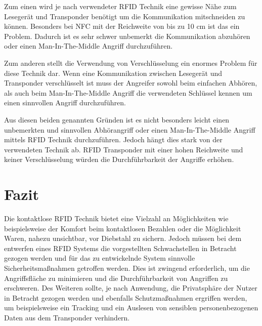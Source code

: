 \documentclass[conference]{IEEEtran}
\begin{document}
Zum einen wird je nach verwendeter RFID Technik eine gewisse Nähe zum Lesegerät und Transponder benötigt um die Kommunikation mitschneiden zu können. Besonders bei NFC mit der Reichweite von bis zu 10 cm ist das ein Problem. Dadurch ist es sehr schwer unbemerkt die Kommunikation abzuhören oder einen Man-In-The-Middle Angriff durchzuführen.

Zum anderen stellt die Verwendung von Verschlüsselung ein enormes Problem für diese Technik dar. Wenn eine Kommunikation zwischen Lesegerät und Transponder verschlüsselt ist muss der Angreifer sowohl beim einfachen Abhören, als auch beim Man-In-The-Middle Angriff die verwendeten Schlüssel kennen um einen sinnvollen Angriff durchzuführen.

Aus diesen beiden genannten Gründen ist es nicht besonders leicht einen unbemerkten und sinnvollen Abhörangriff oder einen Man-In-The-Middle Angriff mittels RFID Technik durchzuführen. Jedoch hängt dies stark von der verwendeten Technik ab. RFID Transponder mit einer hohen Reichweite und keiner Verschlüsselung würden die Durchführbarkeit der Angriffe erhöhen.

\section{Fazit}
Die kontaktlose RFID Technik bietet eine Vielzahl an Möglichkeiten wie beispielsweise der Komfort beim kontaktlosen Bezahlen oder die Möglichkeit Waren, nahezu unsichtbar, vor Diebstahl zu sichern. Jedoch müssen bei dem entwerfen eines RFID Systems die vorgestellten Schwachstellen in Betracht gezogen werden und für das zu entwickelnde System sinnvolle Sicherheitsmaßnahmen getroffen werden. Dies ist zwingend erforderlich, um die Angriffsfläche zu minimieren und die Durchführbarkeit von Angriffen zu erschweren. Des Weiteren sollte, je nach Anwendung, die Privatsphäre der Nutzer in Betracht gezogen werden und ebenfalls Schutzmaßnahmen ergriffen werden, um beispielsweise ein Tracking und ein Auslesen von sensiblen personenbezogenen Daten aus dem Transponder verhindern.
\end{document}
